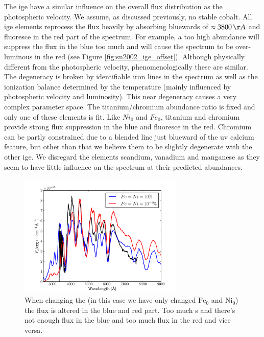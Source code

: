 The \gls{ige} have a similar influence on the overall flux distribution as the photospheric velocity. 
We assume, as discussed previously, no stable cobalt. All \gls{ige} elements reprocess the flux heavily by absorbing bluewards of $\approx 3800\,\AA$ and fluoresce in the red part of the spectrum. For example, a too high abundance will suppress the flux in the blue too much and will cause the spectrum to be over-luminous in the red (see Figure \ref{fig:sn2002_ige_offset}). Although physically different from the photospheric velocity, phenomenologically these are similar. The degeneracy is broken by identifiable iron lines in the spectrum as well as the ionization balance determined by the temperature (mainly influenced by photospheric velocity and luminosity). This near degeneracy causes a very complex parameter space. The titanium/chromium abundance ratio is fixed and only one of these elements is fit. Like $Ni_0$ and $Fe_0$, titanium and chromium provide strong flux suppression in the blue and fluoresce in the red. Chromium can be partly constrained due to a blended line just blueward of the \gls{uv} calcium feature, but other than that we believe them to be slightly degenerate with the other \gls{ige}. We disregard the elements scandium, vanadium and  manganese as they seem to have little influence on the spectrum at their predicted abundances.

\begin{figure}[tb] %
   \centering
   \includegraphics[width=0.7\textwidth]{chapter_dalek/plots/bf2002bo-10_ige.pdf} 
   \caption[Effect of iron group elements on MLMC fit]{When changing the  (in this case we have only changed $\textrm{Fe}_0$ and $\textrm{Ni}_0$) the flux is altered in the blue and red part. Too much s and there's not enough flux in the blue and too much flux in the red and vice versa.}
   \label{fig:sn2002bo_ige_offset}
\end{figure}

